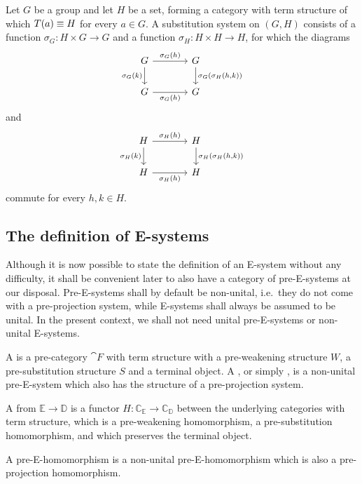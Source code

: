 \begin{eg}
Let $G$ be a group and let $H$ be a set, forming a category with term 
structure of which $T(a)\equiv H$ for every $a\in G$. A substitution
system on $(G,H)$ consists of a function $\sigma_G : H\times G\to G$ and
a function $\sigma_H:H\times H\to H$, for which the diagrams
\begin{equation*}
\begin{tikzcd}[column sep=large]
G \arrow[r,"\sigma_G(h)"]
  \arrow[d,swap,"\sigma_G(k)"]
  &
G \arrow[d,"{\sigma_G(\sigma_H(h,k))}"]
  \\
G \arrow[r,swap,"\sigma_G(h)"] 
& G
\end{tikzcd}
\end{equation*}
and
\begin{equation*}
\begin{tikzcd}[column sep=large]
H \arrow[r,"\sigma_H(h)"]
  \arrow[d,swap,"\sigma_H(k)"]
  &
H \arrow[d,"{\sigma_H(\sigma_H(h,k))}"]
  \\
H \arrow[r,swap,"\sigma_H(h)"]
  &
H
\end{tikzcd}
\end{equation*}
commute for every $h,k\in H$. 
\end{eg}

\subsection{The definition of E-systems}

Although it is now possible to state the definition of an E-system without
any difficulty, it shall be convenient later to also have a category of
pre-E-systems at our disposal. Pre-E-systems shall by default be non-unital,
i.e.~they do not come with a pre-projection system, while E-systems shall
always be assumed to be unital. In the present context, we shall not need
unital pre-E-systems or non-unital E-systems.

\begin{defn}
A  is a pre-category $\cat{F}$ with term structure
with a pre-weakening structure $W$, a pre-substitution structure $S$ and a terminal
object. A , or simply , is a non-unital pre-E-system
which also has the structure of a pre-projection system. 
\end{defn}

\begin{defn}
A  from $\mathbb{E}\to\mathbb{D}$ is a functor
$H:\mathbb{C}_\mathbb{E}\to\mathbb{C}_\mathbb{D}$ between the underlying categories
with term structure, which is a pre-weakening homomorphism, a pre-substitution
homomorphism, and which preserves the terminal object. 

A  pre-E-homomorphism is a non-unital pre-E-homomorphism which is 
also a pre-projection homomorphism. 
\end{defn}

